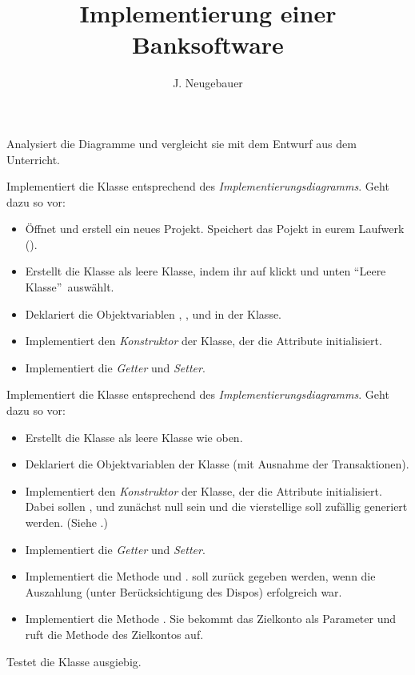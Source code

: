 \documentclass[10pt, a4paper]{scrartcl}
\author{J. Neugebauer}
\title{Implementierung einer Banksoftware}
\date{\Heute}
\begin{document}
\ReiheTitel


\begin{aufgabe}[symbol=\symPartner\,\symLaptop]
	Analysiert die Diagramme und vergleicht sie mit dem Entwurf aus dem Unterricht.
\end{aufgabe}

\begin{aufgabe}[symbol=\symPartner\,\symLaptop]
	Implementiert die Klasse  entsprechend des \emph{Implementierungsdiagramms}. Geht dazu so vor:
	
	\begin{itemize}
		\item Öffnet  und erstell ein neues Projekt. Speichert das Pojekt in eurem Laufwerk ().
		\item Erstellt die Klasse  als leere Klasse, indem ihr auf  klickt und unten \enquote{Leere Klasse} auswählt.
		\item Deklariert die Objektvariablen , ,  und  in der Klasse.
		\item Implementiert den \emph{Konstruktor} der Klasse, der die Attribute initialisiert.
		\item Implementiert die \emph{Getter} und \emph{Setter}.
	\end{itemize}
\end{aufgabe}

\begin{aufgabe}[symbol=\symPartner\,\symLaptop]
	Implementiert die Klasse  entsprechend des \emph{Implementierungsdiagramms}. Geht dazu so vor:
	
	\begin{itemize}
		\item Erstellt die Klasse  als leere Klasse wie oben.
		\item Deklariert die Objektvariablen der Klasse (mit Ausnahme der Transaktionen).
		\item Implementiert den \emph{Konstruktor} der Klasse, der die Attribute initialisiert. Dabei sollen ,  und  zunächst null sein und die vierstellige  soll zufällig generiert werden. (Siehe .)
		\item Implementiert die \emph{Getter} und \emph{Setter}.
		\item Implementiert die Methode  und .  soll  zurück gegeben werden, wenn die Auszahlung (unter Berücksichtigung des Dispos) erfolgreich war.
		\item Implementiert die Methode . Sie bekommt das Zielkonto als Parameter und ruft die Methode  des Zielkontos auf.
	\end{itemize}
	
	Testet die Klasse ausgiebig.
\end{aufgabe}
\end{document}
